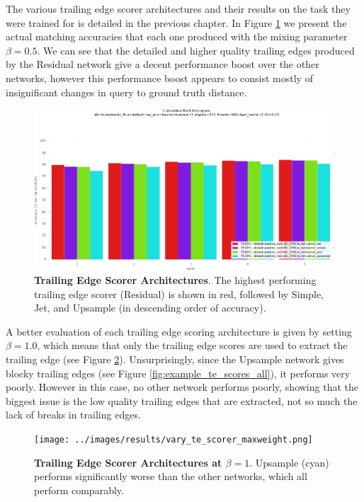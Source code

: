 The various trailing edge scorer architectures and their results on the task they were trained for is detailed in the previous chapter.
In Figure \ref{fig:vary_te_scorer} we present the actual matching accuracies that each one produced with the mixing parameter $\beta = 0.5$.
We can see that the detailed and higher quality trailing edges produced by the Residual network give a decent performance boost over the other networks, however this performance boost appears to consist mostly of insignificant changes in query to ground truth distance.

\begin{figure}[t]%
\centering
\includegraphics[width=1\textwidth]{../images/results/vary_te_scorer.png}
\caption{\textbf{Trailing Edge Scorer Architectures}. The highest performing trailing edge scorer (Residual) is shown in red, followed by Simple, Jet, and Upsample (in descending order of accuracy).}
\label{fig:vary_te_scorer}
\end{figure}



A better evaluation of each trailing edge scoring architecture is given by setting $\beta = 1.0$, which means that only the trailing edge scores are used to extract the trailing edge (see Figure \ref{fig:vary_te_scorer_maxweight}).
Unsurprisingly, since the Upsample network gives blocky trailing edges (see Figure \ref{fig:example_te_scores_all}), it performs very poorly.
However in this case, no other network performs poorly, showing that the biggest issue is the low quality trailing edges that are extracted, not so much the lack of breaks in trailing edges.

\begin{figure}[t]%
\centering
\texttt{[image: ../images/results/vary\_te\_scorer\_maxweight.png]}
\caption{\textbf{Trailing Edge Scorer Architectures at $\beta = 1$}. Upsample (cyan) performs significantly worse than the other networks, which all perform comparably.}
\label{fig:vary_te_scorer_maxweight}
\end{figure}

